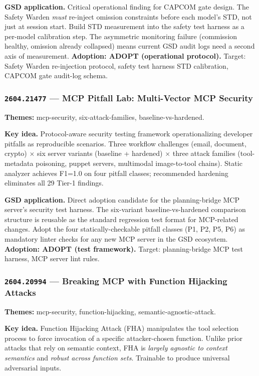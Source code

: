 \documentclass[11pt,letterpaper]{article}
\newcommand{\arxivid}[1]{\texttt{\textcolor{accent}{#1}}}
\newcommand{\paperhead}[2]{\noindent\textbf{\sffamily\textcolor{secondary}{#1}} \textemdash{} #2}
\begin{document}
\textbf{GSD application.} Critical operational finding for CAPCOM gate design. The Safety Warden \textit{must} re-inject omission constraints before each model's STD, not just at session start. Build STD measurement into the safety test harness as a per-model calibration step. The asymmetric monitoring failure (commission healthy, omission already collapsed) means current GSD audit logs need a second axis of measurement. \textbf{Adoption: ADOPT (operational protocol).} Target: Safety Warden re-injection protocol, safety test harness STD calibration, CAPCOM gate audit-log schema.

\subsubsection{\arxivid{2604.21477} --- MCP Pitfall Lab: Multi-Vector MCP Security}

\paperhead{Themes:}{mcp-security, six-attack-families, baseline-vs-hardened.}

\textbf{Key idea.} Protocol-aware security testing framework operationalizing developer pitfalls as reproducible scenarios. Three workflow challenges (email, document, crypto) $\times$ six server variants (baseline + hardened) $\times$ three attack families (tool-metadata poisoning, puppet servers, multimodal image-to-tool chains). Static analyzer achieves F1=1.0 on four pitfall classes; recommended hardening eliminates all 29 Tier-1 findings.

\textbf{GSD application.} Direct adoption candidate for the planning-bridge MCP server's security test harness. The six-variant baseline-vs-hardened comparison structure is reusable as the standard regression test format for MCP-related changes. Adopt the four statically-checkable pitfall classes (P1, P2, P5, P6) as mandatory linter checks for any new MCP server in the GSD ecosystem. \textbf{Adoption: ADOPT (test framework).} Target: planning-bridge MCP test harness, MCP server lint rules.

\subsubsection{\arxivid{2604.20994} --- Breaking MCP with Function Hijacking Attacks}

\paperhead{Themes:}{mcp-security, function-hijacking, semantic-agnostic-attack.}

\textbf{Key idea.} Function Hijacking Attack (FHA) manipulates the tool selection process to force invocation of a specific attacker-chosen function. Unlike prior attacks that rely on semantic context, FHA is \textit{largely agnostic to context semantics} and \textit{robust across function sets}. Trainable to produce universal adversarial inputs.
\end{document}
